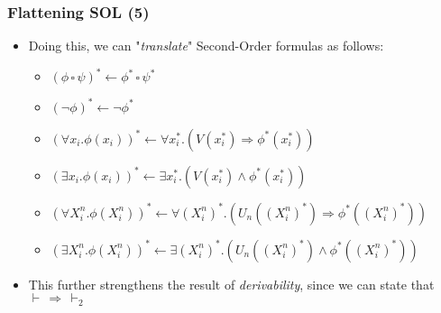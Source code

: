 \documentclass{beamer}
\begin{document}
                \begin{frame}
                    \frametitle{Flattening SOL (5)}
                    \begin{itemize}
                        \item Doing this, we can "\textit{translate}" Second-Order formulas as follows:
                              \begin{itemize}
                                \item $ (\phi\, \square\, \psi)^* \leftarrow \phi^*\, \square\, \psi^* $
                                \item $ (\neg \phi)^* \leftarrow \neg \phi^* $
                                \item $ (\forall x_i. \phi(x_i))^* \leftarrow \forall x_i^*. (V(x_i^*) \Rightarrow \phi^*(x_i^*)) $
                                \item $ (\exists x_i. \phi(x_i))^* \leftarrow \exists x_i^*. (V(x_i^*) \wedge \phi^*(x_i^*)) $
                                \item $ (\forall X^n_i. \phi(X^n_i))^* \leftarrow \forall (X^n_i)^*. (U_n((X^n_i)^*) \Rightarrow \phi^*((X^n_i)^*)) $
                                \item $ (\exists X^n_i. \phi(X^n_i))^* \leftarrow \exists (X^n_i)^*. (U_n((X^n_i)^*) \wedge \phi^*((X^n_i)^*)) $
                              \end{itemize}
                        \item This further strengthens the result of \textit{derivability}, since we can state that $ \vdash\, \Rightarrow\, \vdash_2 $
                    \end{itemize}
                \end{frame}
\end{document}
